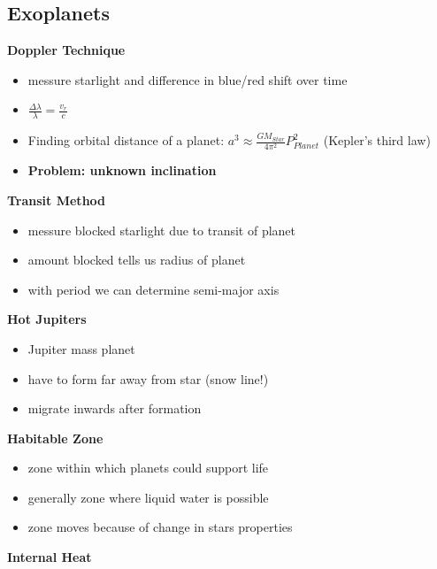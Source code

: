 \documentclass{article}
\theoremstyle{sltheorem}
\begin{document}
\subsection{Exoplanets}
\textbf{Doppler Technique}
\begin{itemize}
	\item messure starlight and difference in blue/red shift over time
	\item $\frac{\Delta\lambda}{\lambda}=\frac{v_r}{c}$
	\item Finding orbital distance of a planet: $a^3\approx \frac{GM_{Star}}{4\pi^2}P_{Planet}^2$ (Kepler's third law)
	\item \textbf{Problem: unknown inclination}
\end{itemize}
\textbf{Transit Method}
\begin{itemize}
	\item messure blocked starlight due to transit of planet
	\item amount blocked tells us radius of planet
	\item with period we can determine semi-major axis
\end{itemize}
\textbf{Hot Jupiters}
\begin{itemize}
	\item Jupiter mass planet
	\item have to form far away from star (snow line!)
	\item migrate inwards after formation
\end{itemize}
\textbf{Habitable Zone}
\begin{itemize}
	\item zone within which planets could support life
	\item generally zone where liquid water is possible
	\item zone moves because of change in stars properties
\end{itemize}
\textbf{Internal Heat}
\end{document}
